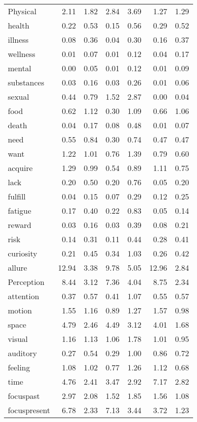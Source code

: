 \begin{longtable}{@{}p{3.4cm}rrrrrr@{}}
Physical & 2.11 & 1.82 & 2.84 & 3.69 & 1.27 & 1.29 \\
health & 0.22 & 0.53 & 0.15 & 0.56 & 0.29 & 0.52 \\
illness & 0.08 & 0.36 & 0.04 & 0.30 & 0.16 & 0.37 \\
wellness & 0.01 & 0.07 & 0.01 & 0.12 & 0.04 & 0.17 \\
mental & 0.00 & 0.05 & 0.01 & 0.12 & 0.01 & 0.09 \\
substances & 0.03 & 0.16 & 0.03 & 0.26 & 0.01 & 0.06 \\
sexual & 0.44 & 0.79 & 1.52 & 2.87 & 0.00 & 0.04 \\
food & 0.62 & 1.12 & 0.30 & 1.09 & 0.66 & 1.06 \\
death & 0.04 & 0.17 & 0.08 & 0.48 & 0.01 & 0.07 \\
need & 0.55 & 0.84 & 0.30 & 0.74 & 0.47 & 0.47 \\
want & 1.22 & 1.01 & 0.76 & 1.39 & 0.79 & 0.60 \\
acquire & 1.29 & 0.99 & 0.54 & 0.89 & 1.11 & 0.75 \\
lack & 0.20 & 0.50 & 0.20 & 0.76 & 0.05 & 0.20 \\
fulfill & 0.04 & 0.15 & 0.07 & 0.29 & 0.12 & 0.25 \\
fatigue & 0.17 & 0.40 & 0.22 & 0.83 & 0.05 & 0.14 \\
reward & 0.03 & 0.16 & 0.03 & 0.39 & 0.08 & 0.21 \\
risk & 0.14 & 0.31 & 0.11 & 0.44 & 0.28 & 0.41 \\
curiosity & 0.21 & 0.45 & 0.34 & 1.03 & 0.26 & 0.42 \\
allure & 12.94 & 3.38 & 9.78 & 5.05 & 12.96 & 2.84 \\
Perception & 8.44 & 3.12 & 7.36 & 4.04 & 8.75 & 2.34 \\
attention & 0.37 & 0.57 & 0.41 & 1.07 & 0.55 & 0.57 \\
motion & 1.55 & 1.16 & 0.89 & 1.27 & 1.57 & 0.98 \\
space & 4.79 & 2.46 & 4.49 & 3.12 & 4.01 & 1.68 \\
visual & 1.16 & 1.13 & 1.06 & 1.78 & 1.01 & 0.95 \\
auditory & 0.27 & 0.54 & 0.29 & 1.00 & 0.86 & 0.72 \\
feeling & 1.08 & 1.02 & 0.77 & 1.26 & 1.12 & 0.68 \\
time & 4.76 & 2.41 & 3.47 & 2.92 & 7.17 & 2.82 \\
focuspast & 2.97 & 2.08 & 1.52 & 1.85 & 1.56 & 1.08 \\
focuspresent & 6.78 & 2.33 & 7.13 & 3.44 & 3.72 & 1.23 \\

\end{longtable}
